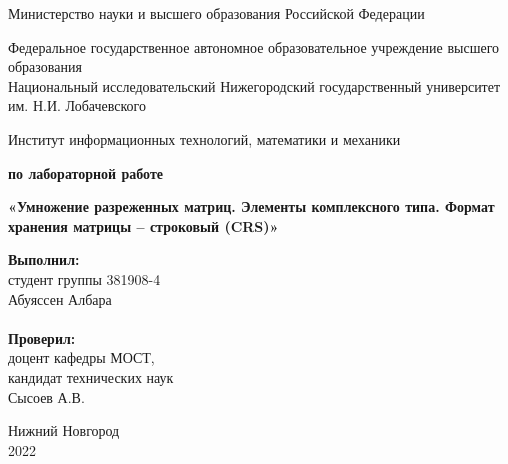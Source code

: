 \documentclass{report}
\begin{document}
\begin{titlepage}

\begin{center}
Министерство науки и высшего образования Российской Федерации
\end{center}

\begin{center}
Федеральное государственное автономное образовательное учреждение высшего образования \\
Национальный исследовательский Нижегородский государственный университет им. Н.И. Лобачевского
\end{center}

\begin{center}
Институт информационных технологий, математики и механики
\end{center}

\vspace{4em}

\begin{center}
\textbf{ по лабораторной работе} \\
\end{center}
\begin{center}
\textbf{\Large«Умножение разреженных матриц. Элементы комплексного типа. Формат хранения матрицы – строковый (CRS)»} \\
\end{center}

\vspace{4em}

\newbox{\lbox}
\newlength{\maxl}
\setlength{\maxl}{\wd\lbox}
\hfill\parbox{7cm}{
\hspace*{5cm}\hspace*{-5cm}\textbf{Выполнил:} \\ студент группы 381908-4 \\ Абуяссен Албара\\
\\
\hspace*{5cm}\hspace*{-5cm}\textbf{Проверил:}\\ доцент кафедры МОСТ, \\ кандидат технических наук \\ Сысоев А.В.\\
}
\vspace{\fill}

\begin{center} Нижний Новгород \\ 2022 \end{center}

\end{titlepage}
\end{document}
